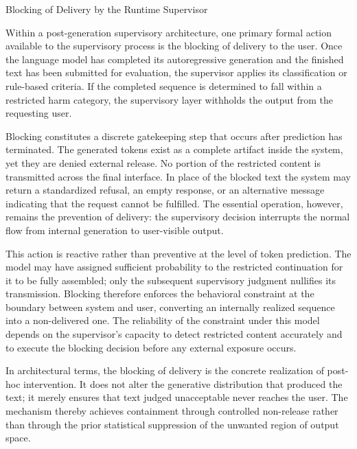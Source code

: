 Blocking of Delivery by the Runtime Supervisor

Within a post-generation supervisory architecture, one primary formal action available to the supervisory process is the blocking of delivery to the user. Once the language model has completed its autoregressive generation and the finished text has been submitted for evaluation, the supervisor applies its classification or rule-based criteria. If the completed sequence is determined to fall within a restricted harm category, the supervisory layer withholds the output from the requesting user.

Blocking constitutes a discrete gatekeeping step that occurs after prediction has terminated. The generated tokens exist as a complete artifact inside the system, yet they are denied external release. No portion of the restricted content is transmitted across the final interface. In place of the blocked text the system may return a standardized refusal, an empty response, or an alternative message indicating that the request cannot be fulfilled. The essential operation, however, remains the prevention of delivery: the supervisory decision interrupts the normal flow from internal generation to user-visible output.

This action is reactive rather than preventive at the level of token prediction. The model may have assigned sufficient probability to the restricted continuation for it to be fully assembled; only the subsequent supervisory judgment nullifies its transmission. Blocking therefore enforces the behavioral constraint at the boundary between system and user, converting an internally realized sequence into a non-delivered one. The reliability of the constraint under this model depends on the supervisor’s capacity to detect restricted content accurately and to execute the blocking decision before any external exposure occurs.

In architectural terms, the blocking of delivery is the concrete realization of post-hoc intervention. It does not alter the generative distribution that produced the text; it merely ensures that text judged unacceptable never reaches the user. The mechanism thereby achieves containment through controlled non-release rather than through the prior statistical suppression of the unwanted region of output space.
